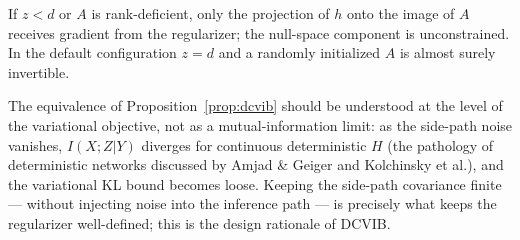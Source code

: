 \begin{remark}\label{rem:rank}
If $z < d$ or $A$ is rank-deficient, only the projection of $h$ onto the image of $A$
receives gradient from the regularizer; the null-space component is unconstrained.
In the default configuration $z = d$ and a randomly initialized $A$ is almost surely invertible.
\end{remark}

\begin{remark}\label{rem:limit}
The equivalence of Proposition~\ref{prop:dcvib} should be understood at the level of the
variational objective, not as a mutual-information limit: as the side-path noise vanishes,
$I(X;Z|Y)$ diverges for continuous deterministic $H$ (the pathology of deterministic
networks discussed by Amjad \& Geiger and Kolchinsky et al.), and the variational KL bound
becomes loose. Keeping the side-path covariance finite --- without injecting noise into the
inference path --- is precisely what keeps the regularizer well-defined; this is the design
rationale of DCVIB.
\end{remark}
